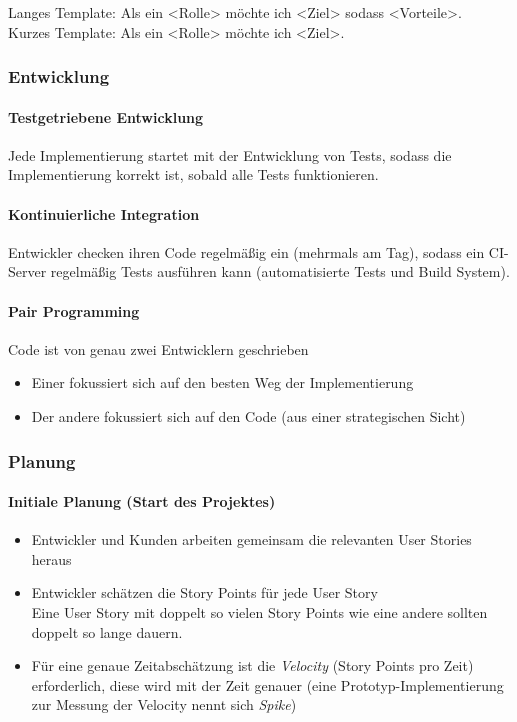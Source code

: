 \documentclass[a4paper, 11pt, accentcolor = tud3b]{tudreport}
\begin{document}
					\noindent Langes Template: Als ein <Rolle> möchte ich <Ziel> sodass <Vorteile>. \\
					Kurzes Template: Als ein <Rolle> möchte ich <Ziel>.
				
				\subsubsection{Entwicklung}
					\paragraph{Testgetriebene Entwicklung}
						Jede Implementierung startet mit der Entwicklung von Tests, sodass die Implementierung korrekt ist, sobald alle Tests funktionieren.
					
					\paragraph{Kontinuierliche Integration}
						Entwickler checken ihren Code regelmäßig ein (mehrmals am Tag), sodass ein CI-Server regelmäßig Tests ausführen kann (automatisierte Tests und Build System).
					
					\paragraph{Pair Programming}
						Code ist von genau zwei Entwicklern geschrieben
						\begin{itemize}
							\item Einer fokussiert sich auf den besten Weg der Implementierung
							\item Der andere fokussiert sich auf den Code (aus einer strategischen Sicht)
						\end{itemize}
				
				\subsubsection{Planung}
					\paragraph{Initiale Planung (Start des Projektes)}
						\begin{itemize}
							\item Entwickler und Kunden arbeiten gemeinsam die relevanten User Stories heraus
							\item Entwickler schätzen die Story Points für jede User Story \\
								  {\small Eine User Story mit doppelt so vielen Story Points wie eine andere sollten doppelt so lange dauern.}
							\item Für eine genaue Zeitabschätzung ist die \textit{Velocity} (Story Points pro Zeit) erforderlich, diese wird mit der Zeit genauer (eine Prototyp-Implementierung zur Messung der Velocity nennt sich \textit{Spike})
						\end{itemize}
					
\end{document}

